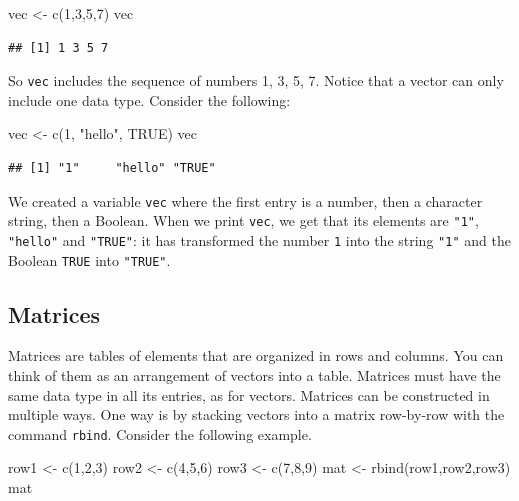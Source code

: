 \documentclass[
]{book}
\newenvironment{Shaded}{\begin{snugshade}}{\end{snugshade}}
\newcommand{\ConstantTok}[1]{\textcolor[rgb]{0.00,0.00,0.00}{#1}}
\newcommand{\DecValTok}[1]{\textcolor[rgb]{0.00,0.00,0.81}{#1}}
\newcommand{\FunctionTok}[1]{\textcolor[rgb]{0.00,0.00,0.00}{#1}}
\newcommand{\NormalTok}[1]{#1}
\newcommand{\OtherTok}[1]{\textcolor[rgb]{0.56,0.35,0.01}{#1}}
\newcommand{\StringTok}[1]{\textcolor[rgb]{0.31,0.60,0.02}{#1}}
\begin{document}
\begin{Shaded}
\begin{Highlighting}[]
\NormalTok{vec }\OtherTok{\textless{}{-}} \FunctionTok{c}\NormalTok{(}\DecValTok{1}\NormalTok{,}\DecValTok{3}\NormalTok{,}\DecValTok{5}\NormalTok{,}\DecValTok{7}\NormalTok{)}
\NormalTok{vec}
\end{Highlighting}
\end{Shaded}

\begin{verbatim}
## [1] 1 3 5 7
\end{verbatim}

So \texttt{vec} includes the sequence of numbers 1, 3, 5, 7. Notice that a vector can only include one data type. Consider the following:

\begin{Shaded}
\begin{Highlighting}[]
\NormalTok{vec }\OtherTok{\textless{}{-}} \FunctionTok{c}\NormalTok{(}\DecValTok{1}\NormalTok{, }\StringTok{"hello"}\NormalTok{, }\ConstantTok{TRUE}\NormalTok{)}
\NormalTok{vec}
\end{Highlighting}
\end{Shaded}

\begin{verbatim}
## [1] "1"     "hello" "TRUE"
\end{verbatim}

We created a variable \texttt{vec} where the first entry is a number, then a character string, then a Boolean. When we print \texttt{vec}, we get that its elements are \texttt{"1"}, \texttt{"hello"} and \texttt{"TRUE"}: it has transformed the number \texttt{1} into the string \texttt{"1"} and the Boolean \texttt{TRUE} into \texttt{"TRUE"}.

\hypertarget{matrices}{%
\subsection{Matrices}\label{matrices}}

Matrices are tables of elements that are organized in rows and columns. You can think of them as an arrangement of vectors into a table. Matrices must have the same data type in all its entries, as for vectors. Matrices can be constructed in multiple ways. One way is by stacking vectors into a matrix row-by-row with the command \texttt{rbind}. Consider the following example.

\begin{Shaded}
\begin{Highlighting}[]
\NormalTok{row1 }\OtherTok{\textless{}{-}} \FunctionTok{c}\NormalTok{(}\DecValTok{1}\NormalTok{,}\DecValTok{2}\NormalTok{,}\DecValTok{3}\NormalTok{)}
\NormalTok{row2 }\OtherTok{\textless{}{-}} \FunctionTok{c}\NormalTok{(}\DecValTok{4}\NormalTok{,}\DecValTok{5}\NormalTok{,}\DecValTok{6}\NormalTok{)}
\NormalTok{row3 }\OtherTok{\textless{}{-}} \FunctionTok{c}\NormalTok{(}\DecValTok{7}\NormalTok{,}\DecValTok{8}\NormalTok{,}\DecValTok{9}\NormalTok{)}
\NormalTok{mat }\OtherTok{\textless{}{-}} \FunctionTok{rbind}\NormalTok{(row1,row2,row3)}
\NormalTok{mat}
\end{Highlighting}
\end{Shaded}
\end{document}

